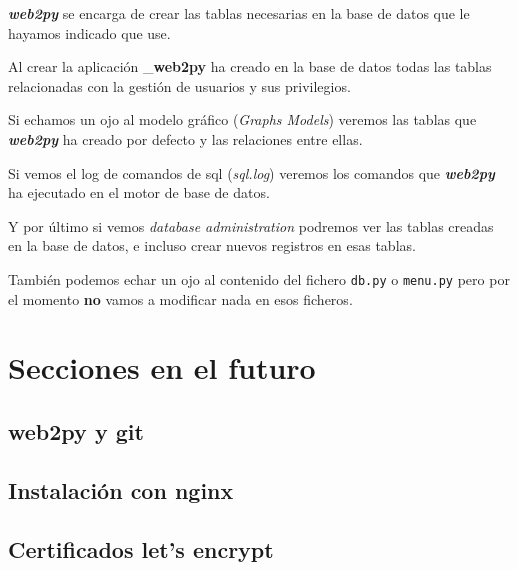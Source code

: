 \documentclass[
  12pt,
  spanish,
]{article}
\begin{document}
\textbf{\emph{web2py}} se encarga de crear las tablas necesarias en la
base de datos que le hayamos indicado que use.

Al crear la aplicación \_\textbf{web2py} ha creado en la base de datos
todas las tablas relacionadas con la gestión de usuarios y sus
privilegios.

Si echamos un ojo al modelo gráfico (\emph{Graphs Models}) veremos las
tablas que \textbf{\emph{web2py}} ha creado por defecto y las relaciones
entre ellas.

Si vemos el log de comandos de sql (\emph{sql.log}) veremos los comandos
que \textbf{\emph{web2py}} ha ejecutado en el motor de base de datos.

Y por último si vemos \emph{database administration} podremos ver las
tablas creadas en la base de datos, e incluso crear nuevos registros en
esas tablas.

También podemos echar un ojo al contenido del fichero \texttt{db.py} o
\texttt{menu.py} pero por el momento \textbf{no} vamos a modificar nada
en esos ficheros.

\hypertarget{secciones-en-el-futuro}{%
\section{Secciones en el futuro}\label{secciones-en-el-futuro}}

\hypertarget{web2py-y-git}{%
\subsection{web2py y git}\label{web2py-y-git}}

\hypertarget{instalaciuxf3n-con-nginx}{%
\subsection{Instalación con nginx}\label{instalaciuxf3n-con-nginx}}

\hypertarget{certificados-lets-encrypt}{%
\subsection{Certificados let's
encrypt}\label{certificados-lets-encrypt}}
\end{document}
